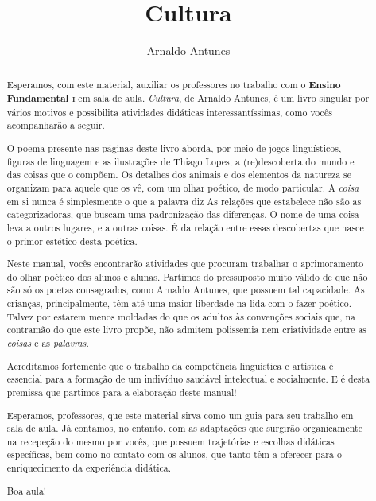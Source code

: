 \documentclass[11pt]{extarticle}
\newcommand{\AutorLivro}{Arnaldo Antunes}
\newcommand{\TituloLivro}{Cultura}
\newcommand{\colaborador}{Renier Silva}
\begin{document}
\title{\TituloLivro}
\author{\AutorLivro}
\def\authornotes{\colaborador}

\date{}
\maketitle

\tableofcontents


\begin{abstract}

Esperamos, com este material,
auxiliar os professores no trabalho com o \textbf{Ensino Fundamental \textsc{i}} em 
sala de aula. \textit{Cultura}, de Arnaldo Antunes, é um livro singular
por vários motivos e possibilita atividades didáticas interessantíssimas,
como vocês acompanharão a seguir.

O poema presente nas páginas deste livro aborda, por meio de jogos linguísticos,
figuras de linguagem e as ilustrações de Thiago Lopes, 
a (re)descoberta do mundo e das coisas que o compõem. 
Os detalhes dos animais e dos elementos da natureza se organizam
para aquele que os vê, com um olhar poético, de modo particular. 
A \textit{coisa} em si nunca é simplesmente o que a palavra diz
As relações que estabelece não são as categorizadoras, que
buscam uma padronização das diferenças.
O nome de uma coisa leva a outros lugares, e a outras coisas.
É da relação entre essas descobertas que nasce o primor estético
desta poética. 

Neste manual, vocês encontrarão atividades que procuram 
trabalhar o aprimoramento do olhar poético dos alunos e alunas. 
Partimos do pressuposto muito válido de que não são só os poetas 
consagrados, como Arnaldo Antunes, que possuem tal capacidade. 
As crianças, principalmente, têm até 
uma maior liberdade na lida com o fazer poético. 
Talvez por estarem menos moldadas do que os adultos 
às convenções sociais que, na contramão do que este livro propõe,
não admitem polissemia nem criatividade entre as \textit{coisas}
e as \textit{palavras}. 

Acreditamos fortemente que o trabalho da competência linguística
e artística é essencial para a formação de um indivíduo saudável 
intelectual e socialmente. E é desta premissa que partimos para
a elaboração deste manual!

Esperamos, professores, que este material sirva como um guia 
para seu trabalho em sala de aula. Já contamos, no entanto, com as adaptações
que surgirão organicamente na recepeção do mesmo por vocês, que possuem 
trajetórias e escolhas didáticas específicas, bem como no contato com os 
alunos, que tanto têm a oferecer para o enriquecimento da experiência didática.

Boa aula!

\end{abstract}
\end{document}
